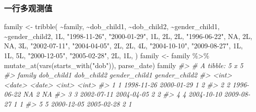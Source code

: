\documentclass[
]{book}
\newenvironment{Shaded}{\begin{snugshade}}{\end{snugshade}}
\newcommand{\CommentTok}[1]{\textcolor[rgb]{0.56,0.35,0.01}{\textit{#1}}}
\newcommand{\ConstantTok}[1]{\textcolor[rgb]{0.00,0.00,0.00}{#1}}
\newcommand{\FunctionTok}[1]{\textcolor[rgb]{0.00,0.00,0.00}{#1}}
\newcommand{\NormalTok}[1]{#1}
\newcommand{\OtherTok}[1]{\textcolor[rgb]{0.56,0.35,0.01}{#1}}
\newcommand{\SpecialCharTok}[1]{\textcolor[rgb]{0.00,0.00,0.00}{#1}}
\newcommand{\StringTok}[1]{\textcolor[rgb]{0.31,0.60,0.02}{#1}}
\begin{document}
\hypertarget{ux4e00ux884cux591aux89c2ux6d4bux503c}{%
\subsubsection{一行多观测值}\label{ux4e00ux884cux591aux89c2ux6d4bux503c}}

\begin{Shaded}
\begin{Highlighting}[]
\NormalTok{family }\OtherTok{\textless{}{-}} \FunctionTok{tribble}\NormalTok{(}
  \SpecialCharTok{\textasciitilde{}}\NormalTok{family, }\SpecialCharTok{\textasciitilde{}}\NormalTok{dob\_child1, }\SpecialCharTok{\textasciitilde{}}\NormalTok{dob\_child2, }\SpecialCharTok{\textasciitilde{}}\NormalTok{gender\_child1, }\SpecialCharTok{\textasciitilde{}}\NormalTok{gender\_child2,}
\NormalTok{  1L, }\StringTok{"1998{-}11{-}26"}\NormalTok{, }\StringTok{"2000{-}01{-}29"}\NormalTok{, 1L, 2L,}
\NormalTok{  2L, }\StringTok{"1996{-}06{-}22"}\NormalTok{, }\ConstantTok{NA}\NormalTok{, 2L, }\ConstantTok{NA}\NormalTok{,}
\NormalTok{  3L, }\StringTok{"2002{-}07{-}11"}\NormalTok{, }\StringTok{"2004{-}04{-}05"}\NormalTok{, 2L, 2L,}
\NormalTok{  4L, }\StringTok{"2004{-}10{-}10"}\NormalTok{, }\StringTok{"2009{-}08{-}27"}\NormalTok{, 1L, 1L,}
\NormalTok{  5L, }\StringTok{"2000{-}12{-}05"}\NormalTok{, }\StringTok{"2005{-}02{-}28"}\NormalTok{, 2L, 1L,}
\NormalTok{)}
\NormalTok{family }\OtherTok{\textless{}{-}}\NormalTok{ family }\SpecialCharTok{\%\textgreater{}\%} \FunctionTok{mutate\_at}\NormalTok{(}\FunctionTok{vars}\NormalTok{(}\FunctionTok{starts\_with}\NormalTok{(}\StringTok{"dob"}\NormalTok{)), parse\_date)}
\NormalTok{family}
\CommentTok{\#\textgreater{} \# A tibble: 5 x 5}
\CommentTok{\#\textgreater{}   family dob\_child1 dob\_child2 gender\_child1 gender\_child2}
\CommentTok{\#\textgreater{}    \textless{}int\textgreater{} \textless{}date\textgreater{}     \textless{}date\textgreater{}             \textless{}int\textgreater{}         \textless{}int\textgreater{}}
\CommentTok{\#\textgreater{} 1      1 1998{-}11{-}26 2000{-}01{-}29             1             2}
\CommentTok{\#\textgreater{} 2      2 1996{-}06{-}22 NA                     2            NA}
\CommentTok{\#\textgreater{} 3      3 2002{-}07{-}11 2004{-}04{-}05             2             2}
\CommentTok{\#\textgreater{} 4      4 2004{-}10{-}10 2009{-}08{-}27             1             1}
\CommentTok{\#\textgreater{} 5      5 2000{-}12{-}05 2005{-}02{-}28             2             1}
\end{Highlighting}
\end{Shaded}
\end{document}
